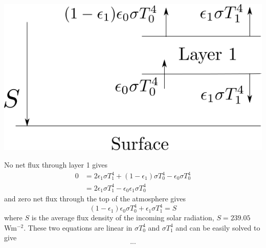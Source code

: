 \documentclass[twocolumn]{article}
\begin{document}
\begin{large}
\begin{center}
    \includegraphics[scale=0.5]{Layer1.png}
\end{center}


No net flux through layer 1 gives 
\begin{equation}
    \begin{split}
        0 &= 2\epsilon_1\sigma T_1^4 + (1-\epsilon_1)\sigma T_0^4 - \epsilon_0\sigma T_0^4 \\ 
        &= 2\epsilon_1\sigma T_1^4 - \epsilon_0\epsilon_1\sigma T_0^4
    \end{split}
\end{equation}
and zero net flux through the top of the atmosphere gives 
\begin{equation}
    (1-\epsilon_1)\epsilon_0\sigma T_0^4 + \epsilon_1\sigma T_1^4 = S
\end{equation}
where $S$ is the average flux density of the incoming solar radiation, $S=239.05$ Wm$^{-2}$. These two equations are linear in $\sigma T_0^4$ and $\sigma T_1^4$ and can be easily solved to give
\begin{equation}
    ...
\end{equation}


\end{large}
\end{document}
